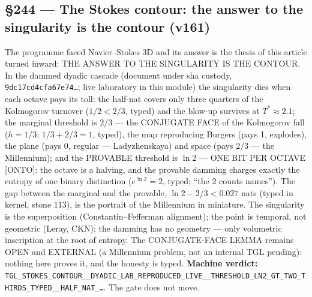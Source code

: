 \documentclass[11pt]{article}
\theoremstyle{definition}\newtheorem{deriv}{Derivation}
\begin{document}
\subsection*{\S244 --- The Stokes contour: the answer to the singularity is the contour (v161)}The programme faced Navier--Stokes 3D and its answer is the thesis of this article turned inward: THE ANSWER TO THE SINGULARITY IS THE CONTOUR. In the dammed dyadic cascade (document under sha custody, \texttt{9dc17cd4cfa67e74\ldots}; live laboratory in this module) the singularity dies when each octave pays its toll: the half-nat covers only three quarters of the Kolmogorov turnover ($1/2 < 2/3$, typed) and the blow-up survives at $T^*{\approx}2.1$; the marginal threshold is $2/3$ --- the CONJUGATE FACE of the Kolmogorov fall ($h{=}1/3$; $1/3{+}2/3{=}1$, typed), the map reproducing Burgers (pays 1, explodes), the plane (pays 0, regular --- Ladyzhenskaya) and space (pays 2/3 --- the Millennium); and the PROVABLE threshold is $\ln 2$ --- ONE BIT PER OCTAVE [ONTO]: the octave is a halving, and the provable damming charges exactly the entropy of one binary distinction ($e^{\ln 2}{=}2$, typed; ``the 2 counts names''). The gap between the marginal and the provable, $\ln 2 - 2/3 < 0.027$ nats (typed in kernel, stone 113), is the portrait of the Millennium in miniature. The singularity is the superposition (Constantin--Fefferman alignment); the point is temporal, not geometric (Leray, CKN); the damming has no geometry --- only volumetric inscription at the root of entropy. The CONJUGATE-FACE LEMMA remains OPEN and EXTERNAL (a Millennium problem, not an internal TGL pending): nothing here proves it, and the honesty is typed. \textbf{Machine verdict:} \texttt{TGL\_STOKES\_CONTOUR\_\_DYADIC\_LAB\_REPRODUCED\_LIVE\_\_THRESHOLD\_LN2\_GT\_TWO\_THIRDS\_TYPED\_\_HALF\_NAT\_\ldots}. The gate does not move.
\end{document}
